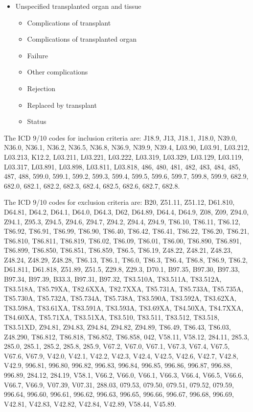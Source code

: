 \begin{itemize}
\begin{itemize}
        \item Unspecified transplanted organ and tissue
        \begin{itemize}
            \item Complications of transplant
            \item Complications of transplanted organ
            \item Failure
            \item Other complications
            \item Rejection
            \item Replaced by transplant
            \item Status
        \end{itemize}
    \end{itemize}
        
\end{itemize}

The ICD 9/10 codes for inclusion criteria are: J18.9, J13, J18.1, J18.0, N39.0, N36.0, N36.1, N36.2, N36.5, N36.8, N36.9, N39.9, N39.4, L03.90, L03.91, L03.212, L03.213, K12.2, L03.211, L03.221, L03.222, L03.319, L03.329, L03.129, L03.119, L03.317, L03.891, L03.898, L03.811, L03.818, 486, 480, 481, 482, 483, 484, 485, 487, 488, 599.0, 599.1, 599.2, 599.3, 599.4, 599.5, 599.6, 599.7, 599.8, 599.9, 682.9, 682.0, 682.1, 682.2, 682.3, 682.4, 682.5, 682.6, 682.7, 682.8.

The ICD 9/10 codes for exclusion criteria are: B20, Z51.11, Z51.12, D61.810, D64.81, D64.2, D64.1, D64.0, D64.3, D62, D64.89, D64.4, D64.9, Z08, Z09, Z94.0, Z94.1, Z95.3, Z94.5, Z94.6, Z94.7, Z94.2, Z94.4, Z94.9, T86.10, T86.11, T86.12, T86.92, T86.91, T86.99, T86.90, T86.40, T86.42, T86.41, T86.22, T86.20, T86.21, T86.810, T86.811, T86.819, T86.02, T86.09, T86.01, T86.00, T86.890, T86.891, T86.899, T86.850, T86.851, T86.859, T86.5, T86.19, Z48.22, Z48.21, Z48.23, Z48.24, Z48.29, Z48.28, T86.13, T86.1, T86.0, T86.3, T86.4, T86.8, T86.9, T86.2, D61.811, D61.818, Z51.89, Z51.5, Z29.8, Z29.3, D70.1, B97.35, B97.30, B97.33, B97.34, B97.39, B33.3, B97.31, B97.32, T83.510A, T83.511A, T83.512A, T83.518A, T85.79XA, T82.6XXA, T82.7XXA, T85.731A, T85.733A, T85.735A, T85.730A, T85.732A, T85.734A, T85.738A, T83.590A, T83.592A, T83.62XA, T83.598A, T83.61XA, T83.591A, T83.593A, T83.69XA, T84.50XA, T84.7XXA, T84.60XA, T85.71XA, T83.51XA, T83.510, T83.511, T83.512, T83.518, T83.51XD, Z94.81, Z94.83, Z94.84, Z94.82, Z94.89, T86.49, T86.43, T86.03, Z48.290, T86.812, T86.818, T86.852, T86.858, 042, V58.11, V58.12, 284.11, 285.3, 285.0, 285.1, 285.2, 285.8, 285.9, V67.2, V67.0, V67.1, V67.3, V67.4, V67.5, V67.6, V67.9, V42.0, V42.1, V42.2, V42.3, V42.4, V42.5, V42.6, V42.7, V42.8, V42.9, 996.81, 996.80, 996.82, 996.83, 996.84, 996.85, 996.86, 996.87, 996.88, 996.89, 284.12, 284.19, V58.1, V66.2, V66.0, V66.1, V66.3, V66.4, V66.5, V66.6, V66.7, V66.9, V07.39, V07.31, 288.03, 079.53, 079.50, 079.51, 079.52, 079.59, 996.64, 996.60, 996.61, 996.62, 996.63, 996.65, 996.66, 996.67, 996.68, 996.69, V42.81, V42.83, V42.82, V42.84, V42.89, V58.44, V45.89.